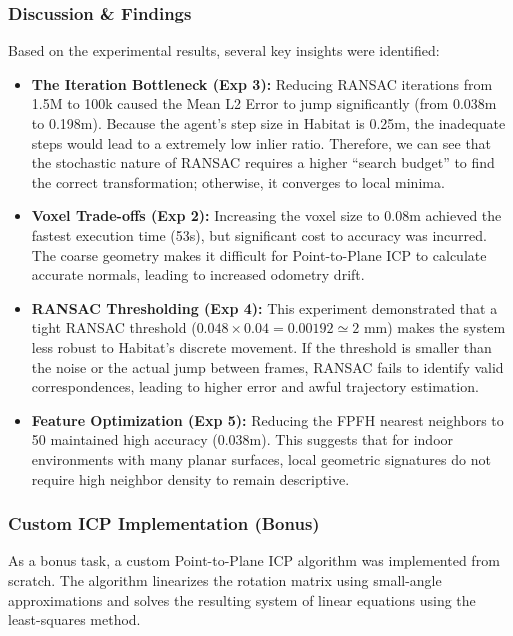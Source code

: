 \documentclass{article}
\begin{document}
\subsubsection{Discussion \& Findings}
Based on the experimental results, several key insights were identified:

\begin{itemize}
    \item \textbf{The Iteration Bottleneck (Exp 3):} Reducing RANSAC iterations from 1.5M to 100k caused the Mean L2 Error to jump significantly (from 0.038m to 0.198m). 
    Because the agent's step size in Habitat is 0.25m, the inadequate steps would lead to a extremely low inlier ratio. 
    Therefore, we can see that the stochastic nature of RANSAC requires a higher ``search budget'' to find the correct transformation; otherwise, it converges to local minima.
    \item \textbf{Voxel Trade-offs (Exp 2):} Increasing the voxel size to 0.08m achieved the fastest execution time (53s), but significant cost to accuracy was incurred. 
    The coarse geometry makes it difficult for Point-to-Plane ICP to calculate accurate normals, leading to increased odometry drift.
    \item \textbf{RANSAC Thresholding (Exp 4):} This experiment demonstrated that a tight RANSAC threshold ($0.048 \times 0.04 = 0.00192 \simeq 2\text{ mm}$) makes the system less 
    robust to Habitat's discrete movement. If the threshold is smaller than the noise or the actual jump between frames, RANSAC fails to identify valid correspondences, leading to 
    higher error and awful trajectory estimation.
    \item \textbf{Feature Optimization (Exp 5):} Reducing the FPFH nearest neighbors to 50 maintained high accuracy (0.038m). This suggests that for indoor environments with many planar surfaces, local geometric signatures do not require high neighbor density to remain descriptive.
\end{itemize}

\subsubsection{Custom ICP Implementation (Bonus)}
As a bonus task, a custom Point-to-Plane ICP algorithm was implemented from scratch. 
The algorithm linearizes the rotation matrix using small-angle approximations and 
solves the resulting system of linear equations using the least-squares method.
\end{document}

